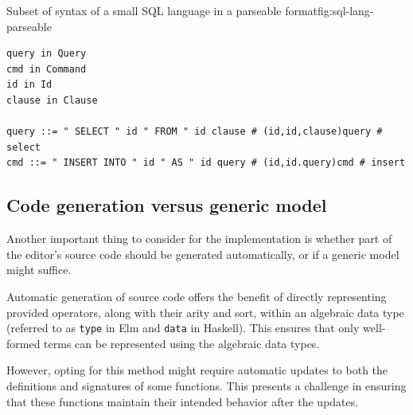 \begin{myfigure}{Subset of syntax of a small SQL language in a parseable format}{fig:sql-lang-parseable}
  \begin{lstlisting}[style=figurestyle]
query in Query
cmd in Command
id in Id
clause in Clause

query ::= " SELECT " id " FROM " id clause # (id,id,clause)query # select
cmd ::= " INSERT INTO " id " AS " id query # (id,id.query)cmd # insert
\end{lstlisting}

\end{myfigure}

\subsection{Code generation versus generic model}

Another important thing to consider for the implementation is whether
part of the editor's source code should be generated automatically,
or if a generic model might suffice.

Automatic generation of source code offers the benefit of directly representing
provided operators, along with their arity and sort, within an algebraic data
type (referred to as \texttt{type} in Elm and \texttt{data} in Haskell).
This ensures that only well-formed terms can be represented using the algebraic
data types.

However, opting for this method might require automatic updates to both the
definitions and signatures of some functions.
This presents a challenge in ensuring that these functions maintain their intended
behavior after the updates.

